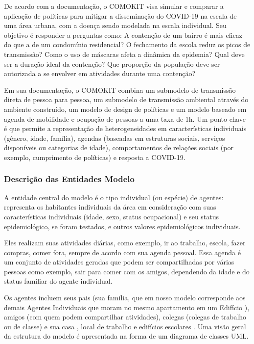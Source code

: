 De acordo com a documentação, o COMOKIT visa simular e comparar a aplicação de políticas para mitigar a disseminação do COVID-19 na escala de uma área urbana, com a doença sendo modelada na escala individual. Seu objetivo é responder a perguntas como: A contenção de um bairro é mais eficaz do que a de um condomínio residencial? O fechamento da escola reduz os picos de transmissão? Como o uso de máscaras afeta a dinâmica da epidemia? Qual deve ser a duração ideal da contenção? Que proporção da população deve ser autorizada a se envolver em atividades durante uma contenção? \cite{gaudou2020comokit}

Em sua documentação, o COMOKIT combina um submodelo de transmissão direta de pessoa para pessoa, um submodelo de transmissão ambiental através do ambiente construído, um modelo de design de políticas e um modelo baseado em agenda de mobilidade e ocupação de pessoas a uma taxa de 1h. Um ponto chave é que permite a representação de heterogeneidades em características individuais (gênero, idade, família), agendas (baseadas em estruturas sociais, serviços disponíveis ou categorias de idade), comportamentos de relações sociais (por exemplo, cumprimento de políticas) e resposta a COVID-19. \cite{gaudou2020comokit}


\subsubsection{Descrição das Entidades Modelo}

A entidade central do modelo é o tipo individual (ou espécie) de agentes: representa os habitantes individuais da área em consideração com suas características individuais (idade, sexo, status ocupacional) e seu status epidemiológico, se foram testados, e outros valores epidemiológicos individuais. \cite{gaudou2020comokit}

Eles realizam suas atividades diárias, como exemplo, ir ao trabalho, escola, fazer compras, comer fora, sempre de acordo com sua agenda pessoal. Essa agenda é um conjunto de atividades geradas que podem ser compartilhadas por várias pessoas como exemplo, sair para comer com os amigos, dependendo da idade e do status familiar do agente individual. \cite{gaudou2020comokit}

Os agentes incluem seus pais (sua família, que em nosso modelo corresponde aos demais Agentes Individuais que moram no mesmo apartamento em um Edifício ), amigos (com quem podem compartilhar atividades), colegas (colegas de trabalho ou de classe) e sua casa , local de trabalho e edifícios escolares . Uma visão geral da estrutura do modelo é apresentada na forma de um diagrama de classes UML. \cite{gaudou2020comokit}



